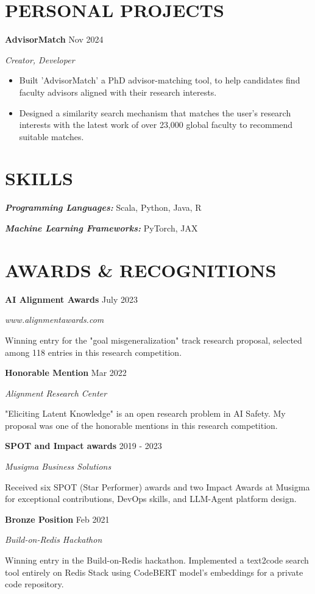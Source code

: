 \documentclass[fontsize=11pt]{article}
\newcommand{\sepspace}{\vspace*{1em}}
\newcommand{\NewPart}[1]{\section*{\uppercase{#1}}}
\newcommand{\SkillsEntry}[2]{
    \noindent\textbf{\textit{#1}} \hspace{1.5em} #2 \par}
\newcommand{\ProjectEntry}[4]{
    \noindent \textbf{#1} \hfill {#2} \par
    \noindent \textit{#3} \par
    \noindent \small #4
    \normalsize \par}
\newcommand{\AwardEntry}[4]{
    \noindent \textbf{#1} \hfill {#2} \par
    \noindent \textit{#3} \par
    \noindent \small #4
    \normalsize \par}
\begin{document}
\NewPart{PERSONAL PROJECTS}

\ProjectEntry{AdvisorMatch}{Nov 2024}{Creator, Developer}
{%
\begin{itemize}
\item Built 'AdvisorMatch' a PhD advisor-matching tool, to help candidates find faculty advisors aligned with their research interests.
\item Designed a similarity search mechanism that matches the user's research interests with the latest work of over 23,000 global faculty to recommend suitable matches.
\end{itemize}}

\NewPart{SKILLS}
\SkillsEntry{Programming Languages:}{Scala, Python, Java, R}
\SkillsEntry{Machine Learning Frameworks:}{PyTorch, JAX}

\NewPart{AWARDS \& RECOGNITIONS}

\AwardEntry{AI Alignment Awards}{July 2023}{www.alignmentawards.com}
{Winning entry for the "goal misgeneralization" track research proposal, selected among 118 entries in this research competition.}

\sepspace

\AwardEntry{Honorable Mention}{Mar 2022}{Alignment Research Center}
{"Eliciting Latent Knowledge" is an open research problem in AI Safety. My proposal was one of the honorable mentions in this research competition.}

\AwardEntry{SPOT and Impact awards}{2019 - 2023}{Musigma Business Solutions}
{Received six SPOT (Star Performer) awards and two Impact Awards at Musigma for exceptional contributions, DevOps skills, and LLM-Agent platform design.}

\sepspace

\AwardEntry{Bronze Position}{Feb 2021}{Build-on-Redis Hackathon}
{Winning entry in the Build-on-Redis hackathon. Implemented a text2code search tool entirely on Redis Stack using CodeBERT model's embeddings for a private code repository.}
\end{document}
